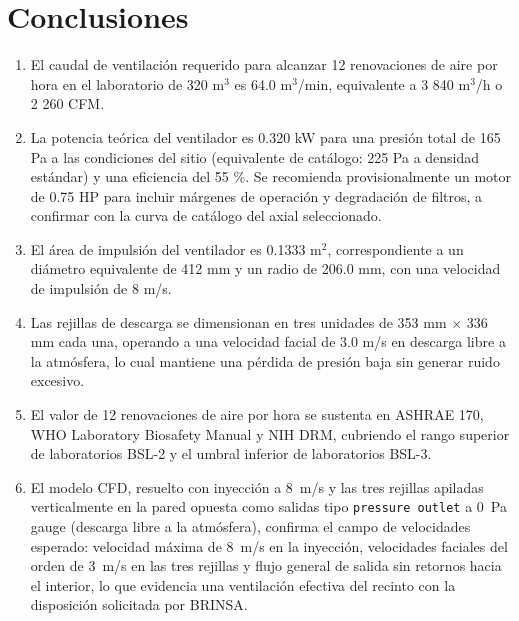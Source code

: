 \section{Conclusiones}

\begin{enumerate}
	\item El caudal de ventilación requerido para alcanzar 12 renovaciones de aire por hora en el laboratorio de 320 m$^3$ es 64.0 m$^3$/min, equivalente a 3 840 m$^3$/h o 2 260 CFM.
	\item La potencia teórica del ventilador es 0.320 kW para una presión total de 165 Pa a las condiciones del sitio (equivalente de catálogo: 225 Pa a densidad estándar) y una eficiencia del 55 \%. Se recomienda provisionalmente un motor de 0.75 HP para incluir márgenes de operación y degradación de filtros, a confirmar con la curva de catálogo del axial seleccionado.
	\item El área de impulsión del ventilador es 0.1333 m$^2$, correspondiente a un diámetro equivalente de 412 mm y un radio de 206.0 mm, con una velocidad de impulsión de 8 m/s.
	\item Las rejillas de descarga se dimensionan en tres unidades de 353 mm $\times$ 336 mm cada una, operando a una velocidad facial de 3.0 m/s en descarga libre a la atmósfera, lo cual mantiene una pérdida de presión baja sin generar ruido excesivo.
	\item El valor de 12 renovaciones de aire por hora se sustenta en ASHRAE 170, WHO Laboratory Biosafety Manual y NIH DRM, cubriendo el rango superior de laboratorios BSL-2 y el umbral inferior de laboratorios BSL-3.
	\item El modelo CFD, resuelto con inyección a \SI{8}{m/s} y las tres rejillas apiladas verticalmente en la pared opuesta como salidas tipo \texttt{pressure outlet} a \SI{0}{Pa} gauge (descarga libre a la atmósfera), confirma el campo de velocidades esperado: velocidad máxima de \SI{8}{m/s} en la inyección, velocidades faciales del orden de \SI{3}{m/s} en las tres rejillas y flujo general de salida sin retornos hacia el interior, lo que evidencia una ventilación efectiva del recinto con la disposición solicitada por BRINSA.
\end{enumerate}
